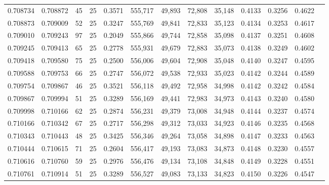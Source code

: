 \begin{tabular}{rrrrrrrrrrrrr}
0.708734 & 0.708872 &    45 &  25 &                                     0.3571 & 555,717 &  49,893 &  72,808 &  35,148 & 0.4133 & 0.3256 & 0.4622 \\
0.708873 & 0.709009 &    52 &  25 &                                     0.3247 & 555,769 &  49,841 &  72,833 &  35,123 & 0.4134 & 0.3253 & 0.4617 \\
0.709010 & 0.709243 &    97 &  25 &                                     0.2049 & 555,866 &  49,744 &  72,858 &  35,098 & 0.4137 & 0.3251 & 0.4608 \\
0.709245 & 0.709413 &    65 &  25 &                                     0.2778 & 555,931 &  49,679 &  72,883 &  35,073 & 0.4138 & 0.3249 & 0.4602 \\
0.709418 & 0.709580 &    75 &  25 &                                     0.2500 & 556,006 &  49,604 &  72,908 &  35,048 & 0.4140 & 0.3247 & 0.4595 \\
0.709588 & 0.709753 &    66 &  25 &                                     0.2747 & 556,072 &  49,538 &  72,933 &  35,023 & 0.4142 & 0.3244 & 0.4589 \\
0.709754 & 0.709867 &    46 &  25 &                                     0.3521 & 556,118 &  49,492 &  72,958 &  34,998 & 0.4142 & 0.3242 & 0.4584 \\
0.709867 & 0.709994 &    51 &  25 &                                     0.3289 & 556,169 &  49,441 &  72,983 &  34,973 & 0.4143 & 0.3240 & 0.4580 \\
0.709998 & 0.710166 &    62 &  25 &                                     0.2874 & 556,231 &  49,379 &  73,008 &  34,948 & 0.4144 & 0.3237 & 0.4574 \\
0.710166 & 0.710342 &    67 &  25 &                                     0.2717 & 556,298 &  49,312 &  73,033 &  34,923 & 0.4146 & 0.3235 & 0.4568 \\
0.710343 & 0.710443 &    48 &  25 &                                     0.3425 & 556,346 &  49,264 &  73,058 &  34,898 & 0.4147 & 0.3233 & 0.4563 \\
0.710444 & 0.710615 &    71 &  25 &                                     0.2604 & 556,417 &  49,193 &  73,083 &  34,873 & 0.4148 & 0.3230 & 0.4557 \\
0.710616 & 0.710760 &    59 &  25 &                                     0.2976 & 556,476 &  49,134 &  73,108 &  34,848 & 0.4149 & 0.3228 & 0.4551 \\
0.710761 & 0.710914 &    51 &  25 &                                     0.3289 & 556,527 &  49,083 &  73,133 &  34,823 & 0.4150 & 0.3226 & 0.4547 \\

\end{tabular}
